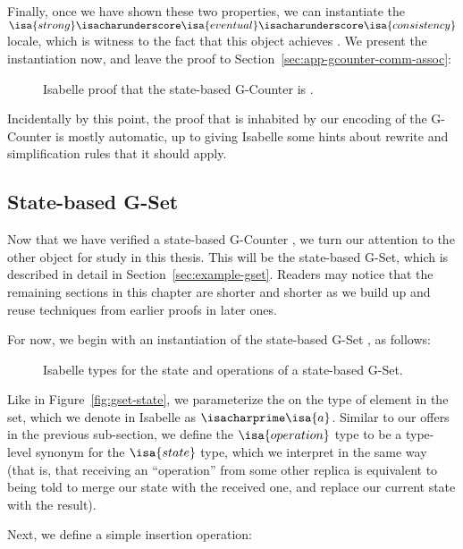 Finally, once we have shown these two properties, we can instantiate the
$\isa{strong}\isacharunderscore\isa{eventual}\isacharunderscore\isa{consistency}$
locale, which is witness to the fact that this \CRDT object achieves \SEC. We
present the instantiation now, and leave the proof to
Section~\ref{sec:app-gcounter-comm-assoc}:

\begin{figure}[H]
  
  \caption{Isabelle proof that the state-based G-Counter \CRDT is \SEC.}
\end{figure}

Incidentally by this point, the proof that \SEC is inhabited by our encoding of
the G-Counter \SEC is mostly automatic, up to giving Isabelle some hints about
rewrite and simplification rules that it should apply.

\subsection{State-based G-Set}
\label{sec:state-gset}

Now that we have verified a state-based G-Counter \CRDT, we turn our attention
to the other \CRDT object for study in this thesis. This will be the state-based
G-Set, which is described in detail in Section~\ref{sec:example-gset}. Readers
may notice that the remaining sections in this chapter are shorter and shorter
as we build up and reuse techniques from earlier proofs in later ones.

For now, we begin with an instantiation of the state-based G-Set \CRDT, as
follows:

\begin{figure}[H]
  
  \caption{Isabelle types for the state and operations of a state-based G-Set.}
\end{figure}

Like in Figure~\ref{fig:gset-state}, we parameterize the \CRDT on the type of
element in the set, which we denote in Isabelle as $\isacharprime\isa{a}$.
Similar to our offers in the previous sub-section, we define the
$\isa{operation}$ type to be a type-level synonym for the $\isa{state}$ type,
which we interpret in the same way (that is, that receiving an ``operation''
from some other replica is equivalent to being told to merge our state with the
received one, and replace our current state with the result).

Next, we define a simple insertion operation:

